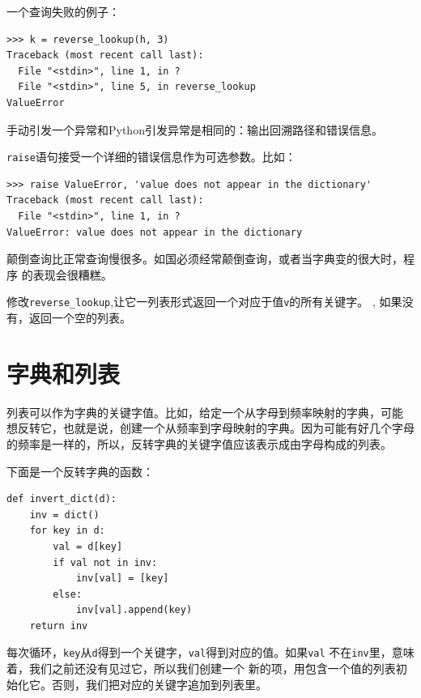一个查询失败的例子：

\beforeverb
\begin{verbatim}
>>> k = reverse_lookup(h, 3)
Traceback (most recent call last):
  File "<stdin>", line 1, in ?
  File "<stdin>", line 5, in reverse_lookup
ValueError
\end{verbatim}
\afterverb

%

手动引发一个异常和Python引发异常是相同的：输出回溯路径和错误信息。


{\tt raise}语句接受一个详细的错误信息作为可选参数。比如：

\beforeverb
\begin{verbatim}
>>> raise ValueError, 'value does not appear in the dictionary'
Traceback (most recent call last):
  File "<stdin>", line 1, in ?
ValueError: value does not appear in the dictionary
\end{verbatim}
\afterverb

颠倒查询比正常查询慢很多。如国必须经常颠倒查询，或者当字典变的很大时，程序
的表现会很糟糕。

\begin{ex}
修改\verb"reverse_lookup",让它一列表形式返回一个对应于值{\tt v}的所有关键字。
, 如果没有，返回一个空的列表。
\end{ex}



\section{字典和列表}

 列表可以作为字典的关键字值。比如，给定一个从字母到频率映射的字典，可能
 想反转它，也就是说，创建一个从频率到字母映射的字典。因为可能有好几个字母
 的频率是一样的，所以，反转字典的关键字值应该表示成由字母构成的列表。


 下面是一个反转字典的函数：

 \beforeverb
\begin{verbatim}
def invert_dict(d):
    inv = dict()
    for key in d:
        val = d[key]
        if val not in inv:
            inv[val] = [key]
        else:
            inv[val].append(key)
    return inv
\end{verbatim}
\afterverb


每次循环，{\tt key}从{\tt d}得到一个关键字，{\tt val}得到对应的值。如果{\tt val}
不在{\tt inv}里，意味着，我们之前还没有见过它，所以我们创建一个
新的项，用包含一个值的列表初始化它。否则，我们把对应的关键字追加到列表里。

